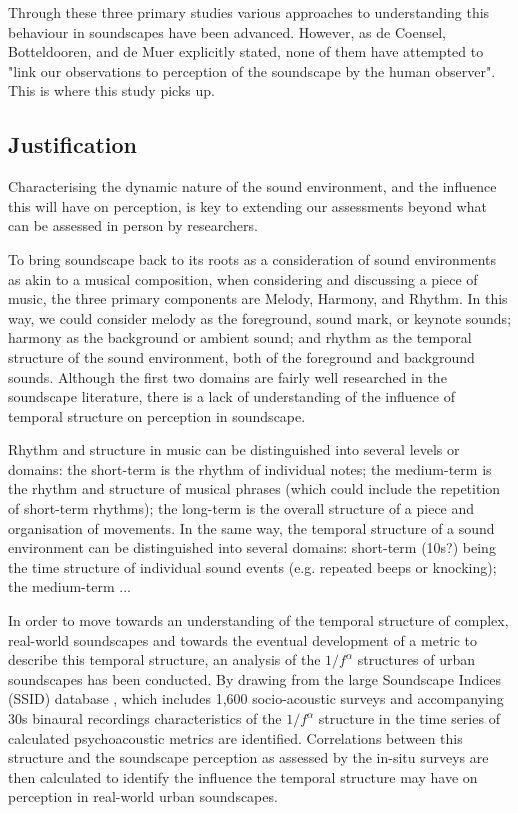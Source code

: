 Through these three primary studies various approaches to understanding this behaviour in soundscapes have been advanced. However, as de Coensel, Botteldooren, and de Muer explicitly stated, none of them have attempted to "link our observations to perception of the soundscape by the human observer". This is where this study picks up.


\subsection{Justification}
Characterising the dynamic nature of the sound environment, and the influence this will have on perception, is key to extending our assessments beyond what can be assessed in person by researchers.

To bring soundscape back to its roots as a consideration of sound environments as akin to a musical composition, when considering and discussing a piece of music, the three primary components are Melody, Harmony, and Rhythm. In this way, we could consider melody as the foreground, sound mark, or keynote sounds; harmony as the background or ambient sound; and rhythm as the temporal structure of the sound environment, both of the foreground and background sounds. Although the first two domains are fairly well researched in the soundscape literature, there is a lack of understanding of the influence of temporal structure on perception in soundscape.

Rhythm and structure in music can be distinguished into several levels or domains: the short-term is the rhythm of individual notes; the medium-term is the rhythm and structure of musical phrases (which could include the repetition of short-term rhythms); the long-term is the overall structure of a piece and organisation of movements. In the same way, the temporal structure of a sound environment can be distinguished into several domains: short-term (10s?) being the time structure of individual sound events (e.g. repeated beeps or knocking); the medium-term ...

In order to move towards an understanding of the temporal structure of complex, real-world soundscapes and towards the eventual development of a metric to describe this temporal structure, an analysis of the $1/f^\alpha$ structures of urban soundscapes has been conducted. By drawing from the large Soundscape Indices (SSID) database \citep{Mitchell2020Soundscape}, which includes 1,600 socio-acoustic surveys and accompanying 30s binaural recordings characteristics of the $1/f^\alpha$ structure in the time series of calculated psychoacoustic metrics are identified. Correlations between this structure and the soundscape perception as assessed by the in-situ surveys are then calculated to identify the influence the temporal structure may have on perception in real-world urban soundscapes.

